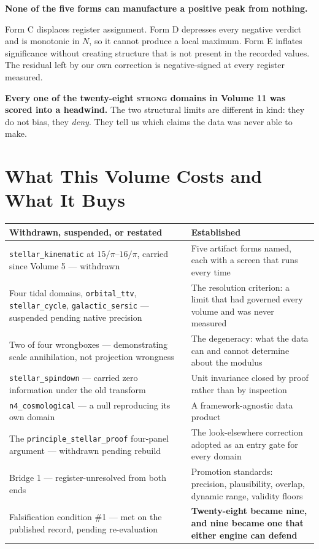 \documentclass[11pt, letterpaper, openany]{book}
\begin{document}
\begin{signalbox}
\textbf{None of the five forms can manufacture a positive peak from nothing.}

\medskip
\noindent Form C displaces register assignment. Form D depresses every negative verdict and is
monotonic in $N$, so it cannot produce a local maximum. Form E inflates significance without
creating structure that is not present in the recorded values. The residual left by our own
correction is negative-signed at every register measured.

\medskip
\noindent \textbf{Every one of the twenty-eight \textsc{strong} domains in Volume 11 was scored
into a headwind.} The two structural limits are different in kind: they do not bias, they
\emph{deny}. They tell us which claims the data was never able to make.
\end{signalbox}

\section{What This Volume Costs and What It Buys}

\begin{table}[H]
\centering
\small
\begin{tabular}{@{}p{}p{}@{}}
\toprule
\textbf{Withdrawn, suspended, or restated} & \textbf{Established} \\
\midrule
\texttt{stellar\_kinematic} at $15/\pi$--$16/\pi$, carried since Volume 5 --- withdrawn &
Five artifact forms named, each with a screen that runs every time \\
\addlinespace
Four tidal domains, \texttt{orbital\_ttv}, \texttt{stellar\_cycle},
\texttt{galactic\_sersic} --- suspended pending native precision &
The resolution criterion: a limit that had governed every volume and was never measured \\
\addlinespace
Two of four wrongboxes --- demonstrating scale annihilation, not projection wrongness &
The degeneracy: what the data can and cannot determine about the modulus \\
\addlinespace
\texttt{stellar\_spindown} --- carried zero information under the old transform &
Unit invariance closed by proof rather than by inspection \\
\addlinespace
\texttt{n4\_cosmological} --- a null reproducing its own domain &
A framework-agnostic data product \\
\addlinespace
The \texttt{principle\_stellar\_proof} four-panel argument --- withdrawn pending rebuild &
The look-elsewhere correction adopted as an entry gate for every domain \\
\addlinespace
Bridge 1 --- register-unresolved from both ends &
Promotion standards: precision, plausibility, overlap, dynamic range, validity floors \\
\addlinespace
Falsification condition \#1 --- met on the published record, pending re-evaluation &
\textbf{Twenty-eight became nine, and nine became one that either engine can defend} \\
\bottomrule
\end{tabular}
\end{table}
\end{document}
